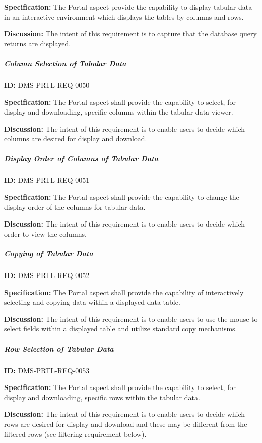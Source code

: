 \documentclass[SE,toc]{lsstdoc}
\begin{document}
\textbf{Specification:}
The Portal aspect provide the capability to display tabular data in an interactive environment which displays the tables by columns and rows.

\textbf{Discussion:}
The intent of this requirement is to capture that the database query returns are displayed.

\subparagraph{Column Selection of Tabular Data}\hfill  %

\label{DMS-PRTL-REQ-0050}
\textbf{ID:} DMS-PRTL-REQ-0050

\textbf{Specification:}
The Portal aspect shall provide the capability to select, for display and downloading, specific columns within the tabular data viewer.

\textbf{Discussion:}
The intent of this requirement is to enable users to decide which columns are desired for display and download.

\subparagraph{Display Order of Columns of Tabular Data}\hfill  %

\label{DMS-PRTL-REQ-0051}
\textbf{ID:} DMS-PRTL-REQ-0051

\textbf{Specification:}
The Portal aspect shall provide the capability to change the display order of the columns for tabular data.

\textbf{Discussion:}
The intent of this requirement is to enable users to decide which order to view the columns.

\subparagraph{Copying of Tabular Data}\hfill  %

\label{DMS-PRTL-REQ-0052}
\textbf{ID:} DMS-PRTL-REQ-0052

\textbf{Specification:}
The Portal aspect shall provide the capability of interactively selecting and copying data within a displayed data table.

\textbf{Discussion:}
The intent of this requirement is to enable users to use the mouse to select fields within a displayed table and utilize standard copy mechanisms.

\subparagraph{Row Selection of Tabular Data}\hfill  %

\label{DMS-PRTL-REQ-0053}
\textbf{ID:} DMS-PRTL-REQ-0053

\textbf{Specification:}
The Portal aspect shall provide the capability to select, for display and downloading, specific rows within the tabular data.

\textbf{Discussion:}
The intent of this requirement is to enable users to decide which rows are desired for display and download and these may be different from the filtered rows (see filtering requirement below).
\end{document}

